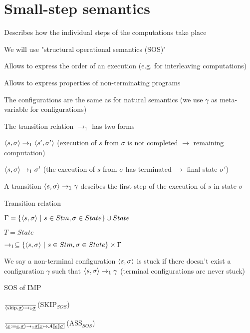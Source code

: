 \section{Small-step semantics}
\enumstart
	\item Describes how the individual steps of the computations take place
	\item We will use "structural operational semantics (SOS)"
	\item Allows to express the order of an execution (e.g. for interleaving computations)
	\item Allows to express properties of non-terminating programs
	\item The configurations are the same as for natural semantics (we use $\gamma$ as meta-variable for configurations)
	\item The transition relation $\rightarrow_1$ has two forms
	\enumstart
		\item $\langle s, \sigma \rangle \rightarrow_1 \langle s', \sigma' \rangle$ (execution of $s$ from $\sigma$ is not completed $\rightarrow$ remaining computation)
		\item $\langle s, \sigma \rangle \rightarrow_1 \sigma'$ (the execution of $s$ from $\sigma$ has terminated $\rightarrow$ final state $\sigma'$)
		\item A transition $\langle s, \sigma \rangle \rightarrow_1 \gamma$ descibes the first step of the execution of $s$ in state $\sigma$
	\enumend
	\item Transition relation
	\enumstart
		\item $\Gamma = \{\langle s, \sigma \rangle \ | \ s \in Stm, \sigma \in State\} \cup State$
		\item $T = State$
		\item $\rightarrow_1 \subseteq \{\langle s, \sigma \rangle \ | \ s \in Stm, \sigma \in State\} \times \Gamma$
		\item We say a non-terminal configuration $\langle s, \sigma \rangle$ is stuck if there doesn't exist a configuration $\gamma$ such that $\langle s, \sigma \rangle \rightarrow_1 \gamma$ (terminal configurations are never stuck)
	\enumend
	\item SOS of IMP
	\enumstart
		\item $\frac{}{\langle \text{skip}, \underline{\sigma} \rangle \rightarrow_1 \underline{\sigma}}$(SKIP$_{SOS}$)
		\item $\frac{}{\langle \underline{x} := \underline{e}, \underline{\sigma} \rangle \rightarrow_1 \underline{\sigma}[\underline{x} \mapsto \mathcal{A}\llbracket \underline{e} \rrbracket\underline{\sigma}]}$(ASS$_{SOS}$)
